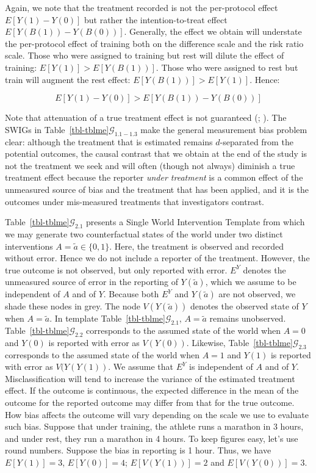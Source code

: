 \documentclass[
  single column]{article}
\begin{document}
Again, we note that the treatment recorded is not the per-protocol
effect \(E[Y(1) - Y(0)]\) but rather the intention-to-treat effect
\(E[Y(B(1)) - Y(B(0))]\). Generally, the effect we obtain will
understate the per-protocol effect of training both on the difference
scale and the risk ratio scale. Those who were assigned to training but
rest will dilute the effect of training: \(E[Y(1)] > E[Y(B(1))]\). Those
who were assigned to rest but train will augment the rest effect:
\(E[Y(B(1))] > E[Y(1)]\). Hence:

\[
 E[Y(1) - Y(0)] > E[Y(B(1)) - Y(B(0))]
\]

Note that attenuation of a true treatment effect is not guaranteed
(;
). The SWIGs in
Table~\ref{tbl-tblme}\(\mathcal{G}_{1.1-1.3}\) make the general
measurement bias problem clear: although the treatment that is estimated
remains \(d\)-separated from the potential outcomes, the causal contrast
that we obtain at the end of the study is not the treatment we seek and
will often (though not always) diminish a true treatment effect because
the reporter \emph{under treatment} is a common effect of the unmeasured
source of bias and the treatment that has been applied, and it is the
outcomes under mis-measured treatments that investigators contrast.

Table~\ref{tbl-tblme}\(\mathcal{G}_{2.1}\) presents a Single World
Intervention Template from which we may generate two counterfactual
states of the world under two distinct interventions
\(A = \tilde{a} \in \{0,1\}\). Here, the treatment is observed and
recorded without error. Hence we do not include a reporter of the
treatment. However, the true outcome is not observed, but only reported
with error. \(E^Y\) denotes the unmeasured source of error in the
reporting of \(Y(\tilde{a})\), which we assume to be independent of
\(A\) and of \(Y\). Because both \(E^Y\) and \(Y(\tilde{a})\) are not
observed, we shade these nodes in grey. The node \(V(Y(\tilde{a}))\)
denotes the observed state of \(Y\) when \(A = \tilde{a}\). In template
Table~\ref{tbl-tblme}\(\mathcal{G}_{2.1}\), \(A = \tilde{a}\) remains
unobserved. Table~\ref{tbl-tblme}\(\mathcal{G}_{2.2}\) corresponds to
the assumed state of the world when \(A=0\) and \(Y(0)\) is reported
with error as \(V(Y(0))\). Likewise,
Table~\ref{tbl-tblme}\(\mathcal{G}_{2.3}\) corresponds to the assumed
state of the world when \(A=1\) and \(Y(1)\) is reported with error as
\(V(Y(Y(1))\). We assume that \(E^Y\) is independent of \(A\) and of
\(Y\). Misclassification will tend to increase the variance of the
estimated treatment effect. If the outcome is continuous, the expected
difference in the mean of the outcome for the reported outcome may
differ from that for the true outcome. How bias affects the outcome will
vary depending on the scale we use to evaluate such bias. Suppose that
under training, the athlete runs a marathon in 3 hours, and under rest,
they run a marathon in 4 hours. To keep figures easy, let's use round
numbers. Suppose the bias in reporting is 1 hour. Thus, we have
\(E[Y(1)] = 3\), \(E[Y(0)] = 4\); \(E[V(Y(1))] = 2\) and
\(E[V(Y(0))] = 3\).
\end{document}
